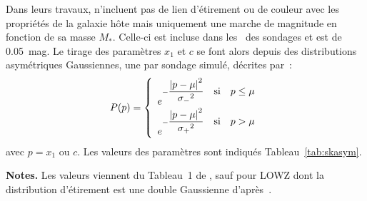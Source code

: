 \documentclass[../main/main.tex]{subfiles}
\begin{document}
Dans leurs travaux,  n'incluent pas de lien d'étirement
ou de couleur avec les propriétés de la galaxie hôte mais uniquement une marche
de magnitude en fonction de sa masse $M_*$. Celle-ci est incluse dans les
\wgtmap\ des sondages et est de \SI{0.05}{mag}. Le tirage des paramètres $x_1$
et $c$ se font alors depuis des distributions asymétriques Gaussiennes, une par
sondage simulé, décrites par~:
\begin{equation}\label{eq:skasym}
    P(p) = \left\{
        \begin{array}{l}
            e^{-\displaystyle\frac{\abs{p-\mu}^2}{\sigma_-{}^2}
                \quad\text{si}\quad p\leq\mu} \\
            e^{-\displaystyle\frac{\abs{p-\mu}^2}{\sigma_+{}^2}
                \quad\text{si}\quad p>\mu} \\
        \end{array}
        \right.
\end{equation}
avec $p = x_1$ ou $c$. Les valeurs des paramètres sont indiqués
Tableau~\ref{tab:skasym}.

\begin{table}[h]
    \centering
        \caption[Paramètres des distributions d'étirement et de couleur pour les
        simulations SK]{Paramètres des distributions sous-jacentes d'étirement
            et de couleur desquelles sont générées les SNe~Ia dans notre
        reproduction du travail de .}
        \label{tab:skasym}
    \begin{threeparttable}
        \begin{tablenotes}[flushleft]
        \item\small \textbf{\hspace{-3,2pt}Notes.} Les valeurs viennent du
            Tableau~1 de , sauf pour LOWZ dont la
            distribution d'étirement est une double Gaussienne
            d'après~\cite{scolnic2018}.
        \end{tablenotes}
    \end{threeparttable}
\end{table}
\end{document}
